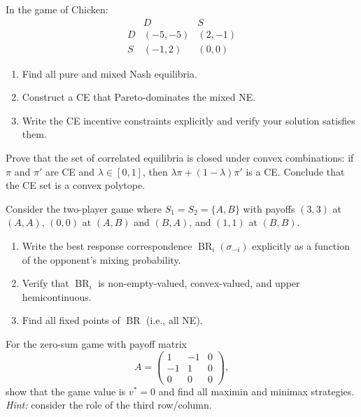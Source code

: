 \documentclass[11pt,a4paper]{article}
\DeclareMathOperator{\BR}{BR}
\begin{document}
\begin{exercise}
\label{ex:ce_construct}
In the game of Chicken:
\[
\begin{array}{c|cc}
 & D & S \\ \hline
D & (-5,-5) & (2,-1) \\
S & (-1,2) & (0,0)
\end{array}
\]
\begin{enumerate}[nosep,label=(\alph*)]
    \item Find all pure and mixed Nash equilibria.
    \item Construct a CE that Pareto-dominates the mixed NE.
    \item Write the CE incentive constraints explicitly and verify your
    solution satisfies them.
\end{enumerate}
\end{exercise}

\begin{exercise}
\label{ex:ce_polytope}
Prove that the set of correlated equilibria is closed under convex
combinations: if $\pi$ and $\pi'$ are CE and $\lambda \in [0,1]$, then
$\lambda \pi + (1-\lambda)\pi'$ is a CE. Conclude that the CE set is
a convex polytope.
\end{exercise}

\begin{exercise}
\label{ex:kakutani_verify}
Consider the two-player game where $S_1 = S_2 = \{A, B\}$ with payoffs
$(3,3)$ at $(A,A)$, $(0,0)$ at $(A,B)$ and $(B,A)$, and $(1,1)$ at $(B,B)$.
\begin{enumerate}[nosep,label=(\alph*)]
    \item Write the best response correspondence $\BR_i(\sigma_{-i})$
    explicitly as a function of the opponent's mixing probability.
    \item Verify that $\BR_i$ is non-empty-valued, convex-valued, and
    upper hemicontinuous.
    \item Find all fixed points of $\BR$ (i.e., all NE).
\end{enumerate}
\end{exercise}

\begin{exercise}
\label{ex:minimax_3x3}
For the zero-sum game with payoff matrix
\[
    A = \begin{pmatrix} 1 & -1 & 0 \\ -1 & 1 & 0 \\ 0 & 0 & 0
    \end{pmatrix},
\]
show that the game value is $v^* = 0$ and find all maximin and minimax
strategies. \textit{Hint:} consider the role of the third row/column.
\end{exercise}
\end{document}
